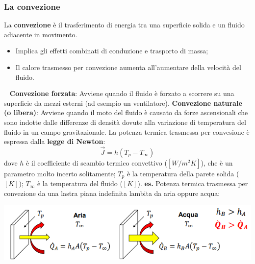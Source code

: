 \subsubsection{La convezione}
La \textbf{convezione} è il trasferimento di energia tra una superficie solida e un fluido adiacente in
movimento.
\begin{itemize}
    \item Implica gli effetti combinati di conduzione e trasporto di massa;
    \item Il calore trasmesso per convezione aumenta all'aumentare della velocità del fluido.
\end{itemize}
\ \newline
\textbf{Convezione forzata}:\newline
Avviene quando il fluido è forzato a scorrere su una superficie da mezzi esterni (ad esempio un ventilatore).\newline
\newline
\textbf{Convezione naturale (o libera)}:\newline
Avviene quando il moto del fluido è causato da forze ascensionali che sono indotte dalle differenze di densità dovute alla variazione di temperatura del fluido in un campo gravitazionale.\newline
\newline
La potenza termica trasmessa per convesione è espressa dalla \textbf{legge di Newton}:
\[
    \vec{J} = h (T_p - T_{\infty})
\]
dove $h$ è il coefficiente di scambio termico convettivo ($[W/m^2K]$), che è un parametro molto incerto solitamente; $T_p$ è la temperatura della parete solida ($[K]$); $T_{\infty}$ è la temperatura del fluido ($[K]$).\newline
\newline
\textbf{es.} Potenza termica trasmessa per convezione da una lastra piana indefinita lambita da aria oppure acqua:
\begin{center}
    \includegraphics[height=3cm]{../L09/img1.PNG}
\end{center}
